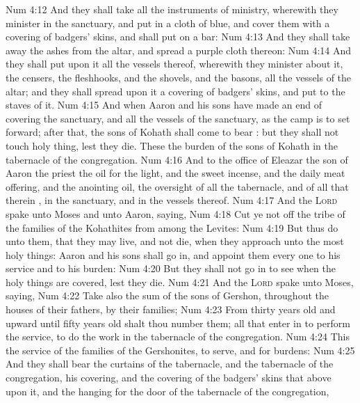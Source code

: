 \vs Num 4:12 And they shall take all the instruments of ministry, wherewith they minister in the sanctuary, and put  in a cloth of blue, and cover them with a covering of badgers' skins, and shall put  on a bar:
\vs Num 4:13 And they shall take away the ashes from the altar, and spread a purple cloth thereon:
\vs Num 4:14 And they shall put upon it all the vessels thereof, wherewith they minister about it,  the censers, the fleshhooks, and the shovels, and the basons, all the vessels of the altar; and they shall spread upon it a covering of badgers' skins, and put to the staves of it.
\vs Num 4:15 And when Aaron and his sons have made an end of covering the sanctuary, and all the vessels of the sanctuary, as the camp is to set forward; after that, the sons of Kohath shall come to bear : but they shall not touch  holy thing, lest they die. These  the burden of the sons of Kohath in the tabernacle of the congregation.
\vs Num 4:16 And to the office of Eleazar the son of Aaron the priest  the oil for the light, and the sweet incense, and the daily meat offering, and the anointing oil,  the oversight of all the tabernacle, and of all that therein , in the sanctuary, and in the vessels thereof.
\vs Num 4:17 And the \textsc{Lord} spake unto Moses and unto Aaron, saying,
\vs Num 4:18 Cut ye not off the tribe of the families of the Kohathites from among the Levites:
\vs Num 4:19 But thus do unto them, that they may live, and not die, when they approach unto the most holy things: Aaron and his sons shall go in, and appoint them every one to his service and to his burden:
\vs Num 4:20 But they shall not go in to see when the holy things are covered, lest they die.
\vs Num 4:21 And the \textsc{Lord} spake unto Moses, saying,
\vs Num 4:22 Take also the sum of the sons of Gershon, throughout the houses of their fathers, by their families;
\vs Num 4:23 From thirty years old and upward until fifty years old shalt thou number them; all that enter in to perform the service, to do the work in the tabernacle of the congregation.
\vs Num 4:24 This  the service of the families of the Gershonites, to serve, and for burdens:
\vs Num 4:25 And they shall bear the curtains of the tabernacle, and the tabernacle of the congregation, his covering, and the covering of the badgers' skins that  above upon it, and the hanging for the door of the tabernacle of the congregation,
